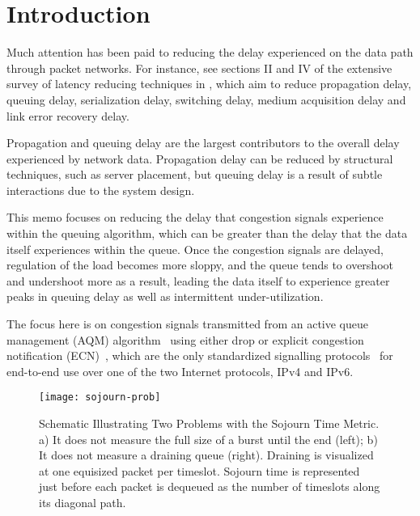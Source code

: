 \section{Introduction}\label{sigqdyntr_intro}

Much attention has been paid to reducing the delay experienced on the data path through packet networks. For instance, see sections II and IV of the extensive survey of latency reducing techniques in \cite{Briscoe14b:latency_survey}, which aim to reduce propagation delay, queuing delay, serialization delay, switching delay, medium acquisition delay and link error recovery delay.

Propagation and queuing delay are the largest contributors to the overall delay experienced by network data. Propagation delay can be reduced by structural techniques, such as server placement, but queuing delay is a result of subtle interactions due to the system design. 

This memo focuses on reducing the delay that congestion signals experience within the queuing algorithm, which can be greater than the delay that the data itself experiences within the queue. Once the congestion signals are delayed, regulation of the load becomes more sloppy, and the queue tends to overshoot and undershoot more as a result, leading the data itself to experience greater peaks in queuing delay as well as intermittent under-utilization. 

The focus here is on congestion signals transmitted from an active queue management (AQM) algorithm~\cite{Adams13:AQM_survey} using either drop or explicit congestion notification (ECN)~\cite{Floyd94:ECN}, which are the only standardized signalling protocols~\cite{IETF_RFC3168:ECN_IP_TCP} for end-to-end use over one of the two Internet protocols, IPv4 and IPv6.

\begin{figure*}
	\centering
	\texttt{[image: sojourn-prob]}
	\caption{Schematic Illustrating Two Problems with the Sojourn Time Metric. a) It does not measure the full size of a burst until the end (left); b) It does not measure a draining queue (right). Draining is visualized at one equisized packet per timeslot. Sojourn time is represented just before each packet is dequeued as the number of timeslots along its diagonal path.}\label{fig:sojourn-prob}
\end{figure*}

